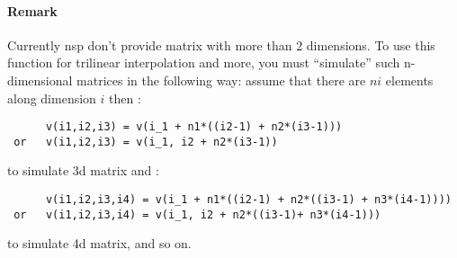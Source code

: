 \paragraph{Remark}
  Currently nsp don't provide matrix with more than 2 dimensions. To
  use this function for trilinear interpolation and more, you must 
  ``simulate'' such n-dimensional matrices in the following way:
  assume that there are $ni$ elements along dimension $i$ then :
  \begin{verbatim}
      v(i1,i2,i3) = v(i_1 + n1*((i2-1) + n2*(i3-1)))
 or   v(i1,i2,i3) = v(i_1, i2 + n2*(i3-1))\end{verbatim}
  to simulate 3d matrix and :
  \begin{verbatim}
      v(i1,i2,i3,i4) = v(i_1 + n1*((i2-1) + n2*((i3-1) + n3*(i4-1))))
 or   v(i1,i2,i3,i4) = v(i_1, i2 + n2*((i3-1)+ n3*(i4-1)))\end{verbatim}
 to simulate 4d matrix, and so on.


